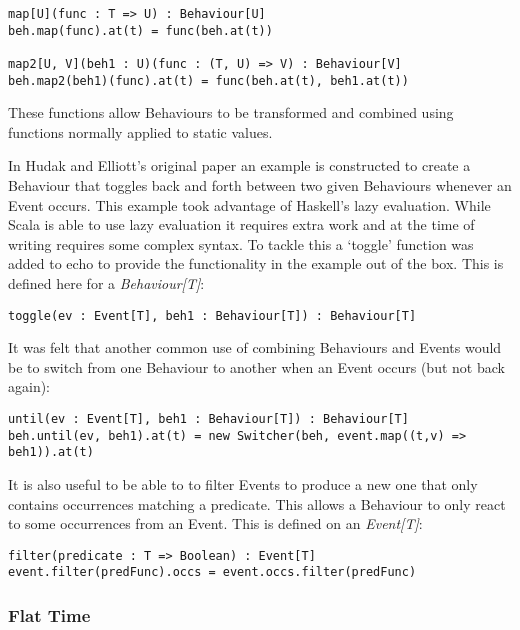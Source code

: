 \documentclass[12pt]{article}
\begin{document}
\begin{verbatim}
map[U](func : T => U) : Behaviour[U]
beh.map(func).at(t) = func(beh.at(t))

map2[U, V](beh1 : U)(func : (T, U) => V) : Behaviour[V]
beh.map2(beh1)(func).at(t) = func(beh.at(t), beh1.at(t))
\end{verbatim}        

        These functions allow Behaviours to be transformed and combined using functions
        normally applied to static values.
        
        In Hudak and Elliott's original paper an example is constructed to create a Behaviour
        that toggles back and forth between two given Behaviours whenever an Event occurs. This
        example took advantage of Haskell's lazy evaluation. While Scala is able to use lazy evaluation
        it requires extra work and at the time of writing requires some complex syntax. To tackle this
        a `toggle' function was added to echo to provide the functionality in the example out of the box.
        This is defined here for a \emph{Behaviour[T]}:
        
\begin{verbatim}
toggle(ev : Event[T], beh1 : Behaviour[T]) : Behaviour[T]
\end{verbatim}        
        
        It was felt that another common use of combining Behaviours and Events would be
        to switch from one Behaviour to another when an Event occurs (but not back again):

\begin{verbatim}
until(ev : Event[T], beh1 : Behaviour[T]) : Behaviour[T]
beh.until(ev, beh1).at(t) = new Switcher(beh, event.map((t,v) => beh1)).at(t)
\end{verbatim}        
        
        It is also useful to be able to to filter Events to produce a new one that only
        contains occurrences matching a predicate. This allows a Behaviour to only react
        to some occurrences from an Event. This is defined on an \emph{Event[T]}:
 
\begin{verbatim}
filter(predicate : T => Boolean) : Event[T]
event.filter(predFunc).occs = event.occs.filter(predFunc)
\end{verbatim}        
      
      \subsubsection{Flat Time}
        
\end{document}
